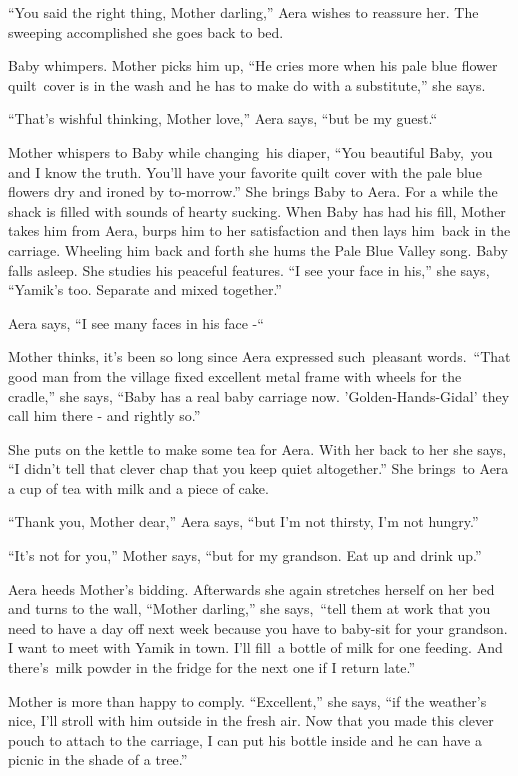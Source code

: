 \documentclass[twoside,11pt]{book}
\begin{document}
``You said the right thing, Mother darling,'' Aera wishes to reassure her. The sweeping
accomplished she goes back to bed.\ 

Baby whimpers. Mother picks him up, ``He cries more when his pale blue flower quilt\ cover is in the wash
and he has to make do with a substitute,'' she says. 

``That's wishful thinking, Mother love,'' Aera says, ``but be my
guest.``\ 

Mother whispers to Baby while changing~his diaper, ``You beautiful Baby,~you and I know the truth. You{}'ll
have your favorite quilt cover with the pale blue flowers dry and ironed by to-morrow.'' She brings Baby
to Aera. For a while the shack is filled with sounds of hearty sucking. When Baby has had his fill, Mother takes him
from Aera, burps him to her satisfaction and then lays him~back in the carriage. Wheeling him back and forth she hums
the Pale Blue Valley song. Baby falls asleep. She studies his peaceful features. ``I see your face in
his,{}'' she says, ``Yamik's too. Separate and mixed together.'' 

Aera says, ``I see many faces in his face -``~ 

Mother thinks, it's been so long since Aera expressed such{\ }pleasant words.\ ``That good
man from the village fixed excellent metal frame with wheels for the cradle,'' she says,
``Baby has a real baby carriage now. 'Golden-Hands-Gidal' they call him there - and rightly
so.'' 

She puts on the kettle to make some tea for Aera. With her back to her she says, ``I didn't tell that
clever chap that you keep quiet altogether.'' She brings\  to Aera a cup of tea with milk and a piece of
cake. 

``Thank you, Mother dear,'' Aera says, ``but I'm not thirsty, I'm not
hungry.'' 

``It's not for you,'' Mother says, ``but for my grandson. Eat up and drink
up.'' 

Aera heeds Mother's bidding. Afterwards she again stretches herself on her bed and turns to the wall,
``Mother darling,'' she says,\ ``tell them at work that you need to have a day
off next week because you have to baby-sit for your grandson. I want to meet with Yamik in town. I'll fill~a bottle of
milk for one feeding. And there's~milk powder in the fridge for the next one if I return late.''

Mother is more than happy to comply. ``Excellent,'' she says, ``if the weather's nice, I'll stroll with him
outside in the fresh air. Now that you made this clever pouch to attach to the carriage, I can put his bottle inside
and he can have a picnic in the shade of a tree.''
\end{document}
